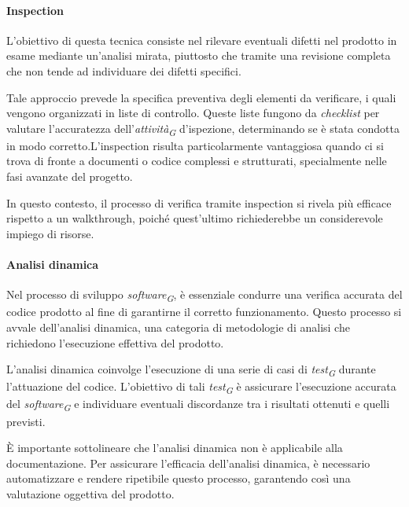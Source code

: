 \paragraph{Inspection}
L'obiettivo di questa tecnica consiste nel rilevare eventuali difetti nel prodotto in esame mediante un'analisi mirata, piuttosto che tramite una revisione completa che non tende ad individuare dei difetti specifici.

\vspace{0.2cm}

Tale approccio prevede la specifica preventiva degli elementi da verificare, i quali vengono organizzati in liste di controllo.
Queste liste fungono da \textit{checklist} per valutare l'accuratezza dell'\textit{attività}\textsubscript{\textit{G}} d'ispezione, determinando se è stata condotta in modo corretto.L'inspection risulta particolarmente vantaggiosa quando ci si trova di fronte a documenti o codice complessi e strutturati, specialmente nelle fasi avanzate del progetto.

In questo contesto, il processo di verifica tramite inspection si rivela più efficace rispetto a un walkthrough, poiché quest'ultimo richiederebbe un considerevole impiego di risorse.

\paragraph{Analisi dinamica}
Nel processo di sviluppo \textit{software}\textsubscript{\textit{G}}, è essenziale condurre una verifica accurata del codice prodotto al fine di garantirne il corretto funzionamento. Questo processo si avvale dell'analisi dinamica, una categoria di metodologie di analisi che richiedono l'esecuzione effettiva del prodotto.

\vspace{0.2cm}

L'analisi dinamica coinvolge l'esecuzione di una serie di casi di \textit{test}\textsubscript{\textit{G}} durante l'attuazione del codice. L'obiettivo di tali \textit{test}\textsubscript{\textit{G}} è assicurare l'esecuzione accurata del \textit{software}\textsubscript{\textit{G}} e individuare eventuali discordanze tra i risultati ottenuti e quelli previsti. 

\vspace{0.2cm}

È importante sottolineare che l'analisi dinamica non è applicabile alla documentazione.
Per assicurare l'efficacia dell'analisi dinamica, è necessario automatizzare e rendere ripetibile questo processo, garantendo così una valutazione oggettiva del prodotto.

